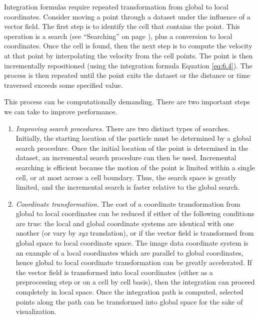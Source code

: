 Integration formulas require repeated transformation from global to local coordinates. Consider moving a point through a dataset under the influence of a vector field. The first step is to identify the cell that contains the point. This operation is a search (see ``Searching'' on page \pageref{sec:searching} ), plus a conversion to local coordinates. Once the cell is found, then the next step is to compute the velocity at that point by interpolating the velocity from the cell points. The point is then incrementally repositioned (using the integration formula Equation \ref{eq:6.4}).
The process is then repeated until the point exits the dataset or the distance or time traversed exceeds some specified value.

This process can be computationally demanding. There are two important steps we can take to improve performance.

\begin{enumerate}

\item \emph{Improving search procedures.} There are two distinct types of searches. Initially, the starting location of the particle must be determined by a global search procedure. Once the initial location of the point is determined in the dataset, an incremental search procedure can then be used. Incremental searching is efficient because the motion of the point is limited within a single cell, or at most across a cell boundary. Thus, the search space is greatly limited, and the incremental search is faster relative to the global search.

\item \emph{Coordinate transformation.} The cost of a coordinate transformation from global to local coordinates can be reduced if either of the following conditions are true: the local and global coordinate systems are identical with one another (or vary by \emph{xyz} translation), or if the vector field is transformed from global space to local coordinate space. The image data coordinate system is an example of a local coordinates which are parallel to global coordinates, hence global to local coordinate transformation can be greatly accelerated. If the vector field is transformed into local coordinates (either as a preprocessing step or on a cell by cell basis), then the integration can proceed completely in local space. Once the integration path is computed, selected points along the path can be transformed into global space for the sake of visualization.

\end{enumerate}

